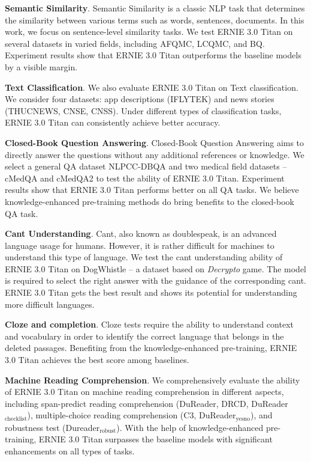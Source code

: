 \textbf{Semantic Similarity}. Semantic Similarity is a classic NLP task that determines the similarity between various terms such as words, sentences, documents. In this work, we focus on sentence-level similarity tasks. We test ERNIE 3.0 Titan on several datasets in varied fields, including AFQMC, LCQMC, and BQ. Experiment results show that ERNIE 3.0 Titan outperforms the baseline models by a visible margin. 

\textbf{Text Classification}. We also evaluate ERNIE 3.0 Titan on Text classification. We consider four datasets: app descriptions (IFLYTEK) and news stories (THUCNEWS, CNSE, CNSS). Under different types of classification tasks, ERNIE 3.0 Titan can consistently achieve better accuracy.

\textbf{Closed-Book Question Answering}. Closed-Book Question Answering aims to directly answer the questions without any additional references or knowledge. We select a general QA dataset NLPCC-DBQA and two medical field datasets -- cMedQA and cMedQA2 to test the ability of ERNIE 3.0 Titan. Experiment results show that ERNIE 3.0 Titan performs better on all QA tasks. We believe knowledge-enhanced pre-training methods do bring benefits to the closed-book QA task.

\textbf{Cant Understanding}. Cant, also known as doublespeak, is an advanced language usage for humans. However, it is rather difficult for machines to understand this type of language. We test the cant understanding ability of ERNIE 3.0 Titan on DogWhistle -- a dataset based on \emph{Decrypto} game.  The model is required to select the right answer with the guidance of the corresponding cant. ERNIE 3.0 Titan gets the best result and shows its potential for understanding more difficult languages.

\textbf{Cloze and completion}. Cloze tests require the ability to understand context and vocabulary in order to identify the correct language that belongs in the deleted passages. Benefiting from the knowledge-enhanced pre-training, ERNIE 3.0 Titan achieves the best score among baselines. 

\textbf{Machine Reading Comprehension}. We comprehensively evaluate the ability of ERNIE 3.0 Titan on machine reading comprehension in different aspects, including span-predict reading comprehension (DuReader, DRCD, DuReader$_\text{checklist}$), multiple-choice reading comprehension (C3, DuReader$_\text{yesno}$), and robustness test (Dureader$_\text{robust}$). With the help of knowledge-enhanced pre-training, ERNIE 3.0 Titan surpasses the baseline models with significant enhancements on all types of tasks.

